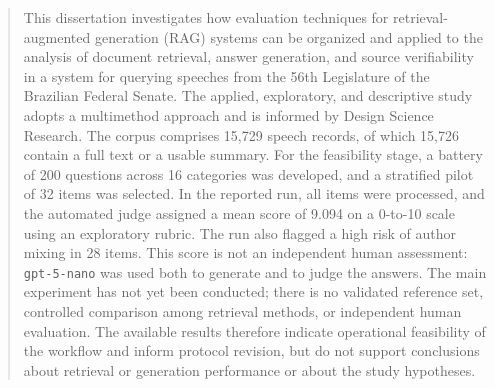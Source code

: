 \begin{abstract}
This dissertation investigates how evaluation techniques for retrieval-augmented generation (RAG) systems can be organized and applied to the analysis of document retrieval, answer generation, and source verifiability in a system for querying speeches from the 56th Legislature of the Brazilian Federal Senate. The applied, exploratory, and descriptive study adopts a multimethod approach and is informed by Design Science Research. The corpus comprises 15,729 speech records, of which 15,726 contain a full text or a usable summary. For the feasibility stage, a battery of 200 questions across 16 categories was developed, and a stratified pilot of 32 items was selected. In the reported run, all items were processed, and the automated judge assigned a mean score of 9.094 on a 0-to-10 scale using an exploratory rubric. The run also flagged a high risk of author mixing in 28 items. This score is not an independent human assessment: \texttt{gpt-5-nano} was used both to generate and to judge the answers. The main experiment has not yet been conducted; there is no validated reference set, controlled comparison among retrieval methods, or independent human evaluation. The available results therefore indicate operational feasibility of the workflow and inform protocol revision, but do not support conclusions about retrieval or generation performance or about the study hypotheses.
\end{abstract}
